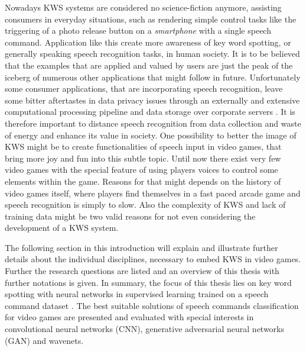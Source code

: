 Nowadays KWS systems are considered no science-fiction anymore, assisting consumers in everyday situations, such as rendering simple control tasks like the triggering of a photo release button on a \emph{smartphone} with a single speech command.
Application like this create more awareness of key word spotting, or generally speaking speech recognition tasks, in human society.
It is to be believed that the examples that are applied and valued by users are just the peak of the iceberg of numerous other applications that might follow in future.
Unfortunately some consumer applications, that are incorporating speech recognition, leave some bitter aftertastes in data privacy issues through an externally and extensive computational processing pipeline and data storage over corporate servers \cite{Tang2018}.
It is therefore important to distance speech recognition from data collection and waste of energy and enhance its value in society.
One possibility to better the image of KWS might be to create functionalities of speech input in video games, that bring more joy and fun into this subtle topic.
Until now there exist very few video games with the special feature of using players voices to control some elements within the game.
Reasons for that might depends on the history of video games itself, where players find themselves in a fast paced arcade game and speech recognition is simply to slow. 
Also the complexity of KWS and lack of training data might be two valid reasons for not even considering the development of a KWS system.

The following section in this introduction will explain and illustrate further details about the individual disciplines, necessary to embed KWS in video games. 
Further the research questions are listed and an overview of this thesis with further notations is given.
In summary, the focus of this thesis lies on key word spotting with neural networks in supervised learning trained on a speech command dataset \cite{Warden2018}.
The best suitable solutions of speech commands classification for video games are presented and evaluated with special interests in convolutional neural networks (CNN), generative adversarial neural networks (GAN) and wavenets.




\newpage











